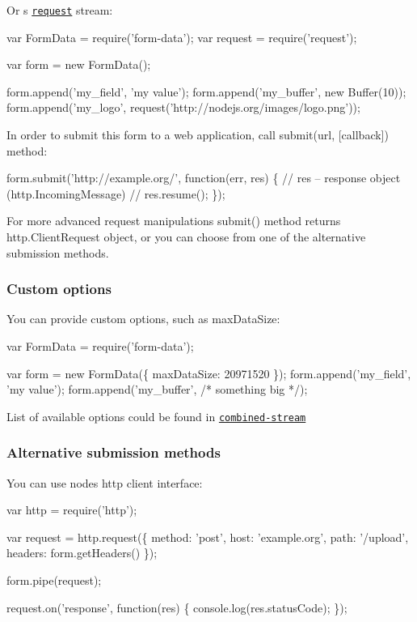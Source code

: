 Or \textquotesingle{}s \href{https://github.com/request/request}{\tt request} stream\+:


\begin{DoxyCode}
var FormData = require('form-data');
var request = require('request');

var form = new FormData();

form.append('my\_field', 'my value');
form.append('my\_buffer', new Buffer(10));
form.append('my\_logo', request('http://nodejs.org/images/logo.png'));
\end{DoxyCode}


In order to submit this form to a web application, call {\ttfamily submit(url, \mbox{[}callback\mbox{]})} method\+:


\begin{DoxyCode}
form.submit('http://example.org/', function(err, res) \{
  // res – response object (http.IncomingMessage)  //
  res.resume();
\});
\end{DoxyCode}


For more advanced request manipulations {\ttfamily submit()} method returns {\ttfamily http.\+Client\+Request} object, or you can choose from one of the alternative submission methods.

\subsubsection*{Custom options}

You can provide custom options, such as {\ttfamily max\+Data\+Size}\+:


\begin{DoxyCode}
var FormData = require('form-data');

var form = new FormData(\{ maxDataSize: 20971520 \});
form.append('my\_field', 'my value');
form.append('my\_buffer', /* something big */);
\end{DoxyCode}


List of available options could be found in \href{https://github.com/felixge/node-combined-stream/blob/master/lib/combined_stream.js#L7-L15}{\tt combined-\/stream}

\subsubsection*{Alternative submission methods}

You can use node\textquotesingle{}s http client interface\+:


\begin{DoxyCode}
var http = require('http');

var request = http.request(\{
  method: 'post',
  host: 'example.org',
  path: '/upload',
  headers: form.getHeaders()
\});

form.pipe(request);

request.on('response', function(res) \{
  console.log(res.statusCode);
\});
\end{DoxyCode}


